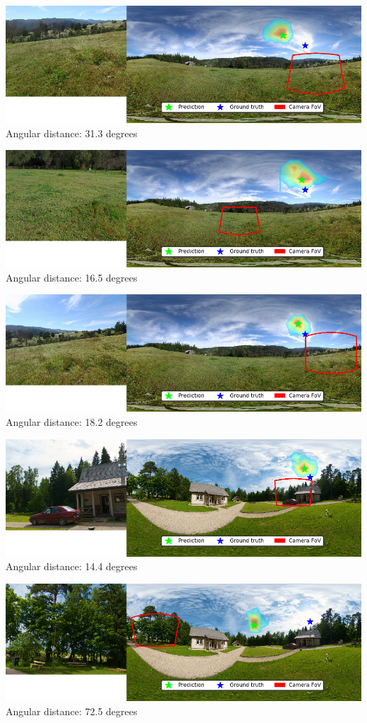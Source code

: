 \begin{multicols}{2}
\includegraphics[width=\mywidth]{pano_aaxximpglpmmvj_005.jpg}\\
Angular distance: 31.3 degrees

\includegraphics[width=\mywidth]{pano_aaxximpglpmmvj_002.jpg}\\
Angular distance: 16.5 degrees

\includegraphics[width=\mywidth]{pano_aaxximpglpmmvj_004.jpg}\\
Angular distance: 18.2 degrees

\includegraphics[width=\mywidth]{pano_aazdyyemiqnyfe_005.jpg}\\
Angular distance: 14.4 degrees

\includegraphics[width=\mywidth]{pano_aazdyyemiqnyfe.jpg}\\
Angular distance: 72.5 degrees


\end{multicols}
